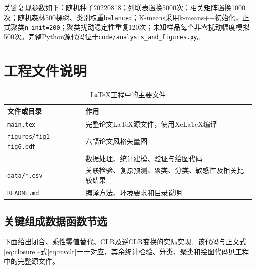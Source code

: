 \documentclass[UTF8,a4paper,zihao=-4,fontset=windows]{ctexart}
\begin{document}
关键复现参数如下：随机种子20220818；列联表置换5000次；相关矩阵置换1000次；随机森林500棵树、类别权重\texttt{balanced}；K-means采用k-means++初始化，正式聚类\texttt{n\_init=200}；聚类扰动稳定性重复120次；未知样品每个非零扰动幅度模拟500次。完整Python源代码位于\texttt{code/analysis\_and\_figures.py}。

\section{工程文件说明}

\begin{table}[H]
\centering
\caption{LaTeX工程中的主要文件}
\begin{tabularx}{0.94\textwidth}{P{0.37\textwidth}X}
\toprule
文件或目录 & 作用 \\
\midrule
\texttt{main.tex} & 完整论文LaTeX源文件，使用XeLaTeX编译 \\
\texttt{figures/fig1--fig6.pdf} & 六幅论文风格矢量图 \\
 & 数据处理、统计建模、验证与绘图代码 \\
\texttt{data/*.csv} & 关联检验、复原预测、聚类、分类、敏感性及相关比较结果 \\
\texttt{README.md} & 编译方法、环境要求和目录说明 \\
\bottomrule
\end{tabularx}
\end{table}

\subsection*{关键组成数据函数节选}

下面给出闭合、乘性零值替代、CLR及逆CLR变换的实际实现。该代码与正文式\eqref{eq:closure}--式\eqref{eq:invclr}一一对应，其余统计检验、分类、聚类和绘图代码见工程中的完整源文件。


\end{document}

